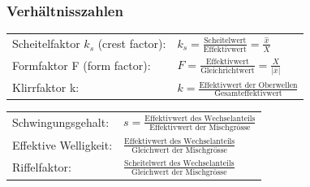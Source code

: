 	\subsubsection{Verhältnisszahlen}
		\begin{multicols}{2}
			\begin{tabular}{ll}
				Scheitelfaktor $k_s$ (crest factor): 
					& $k_s = \frac{\text{Scheitelwert}} 	
							{\text{Effektivwert}} = \frac{\hat{x}}{X}$ \\
   				Formfaktor F (form factor): 
   				 	& $F = \frac{\text{Effektivwert}}
   				 			{\text{Gleichrichtwert}} = \frac{X}{|\bar{x}|}$ \\	
   				Klirrfaktor k: 
   				    & $k = \frac{\text{Effektivwert der 	
   				    					Oberwellen}}
   				    		{\text{Gesamteffektivwert}}$ \\
			\end{tabular}
			\columnbreak
	
			\begin{tabular}{ll}
				Schwingungsgehalt: 
					& $s = \frac{\text{Effektivwert des 	
										Wechselanteils}}
							{\text{Effektivwert der 		
									Mischgr\"osse}}$ \\
				Effektive Welligkeit:
					 & $\frac{\text{Effektivwert des 		
					 				Wechselanteils}}
					 		{\text{Gleichwert der 	
					 				Mischgr\"osse}}$ \\
				Riffelfaktor: 
					& $\frac{\text{Scheitelwert des 	
									Wechselanteils}}
							{\text{Gleichwert der 
									Mischgr\"osse}}$ \\
			\end{tabular}
		\end{multicols}

